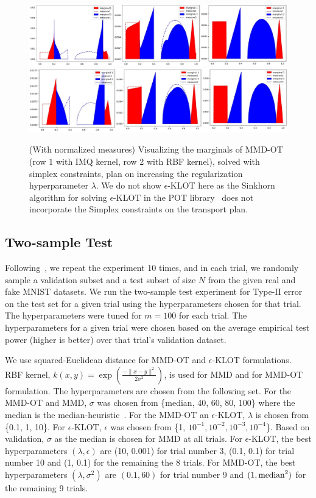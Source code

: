 \begin{figure}[t]
    \centering
    \includegraphics[width=\linewidth]{chapter-1/images/bal-IMQ.pdf}\\
\includegraphics[width=\linewidth]{chapter-1/images/bal-RBF.pdf}
    \caption{(With normalized measures) Visualizing the marginals of MMD-OT (row 1 with IMQ kernel, row 2 with RBF kernel), solved with simplex constraints, plan on increasing the regularization hyperparameter $\lambda$. We do not show $\epsilon$-KLOT here as the Sinkhorn algorithm for solving $\epsilon$-KLOT in the POT library~\citep{flamary2021pot} does not incorporate the Simplex constraints on the transport plan.}
    \label{fig:reg-bal}
\end{figure}

\subsection{Two-sample Test}\label{app:tst}
Following~\cite{dktst}, we repeat the experiment 10 times, and in each trial, we randomly sample a validation subset and a test subset of size $N$ from the given real and fake MNIST datasets. We run the two-sample test experiment for Type-II error on the test set for a given trial using the hyperparameters chosen for that trial. The hyperparameters were tuned for $m=100$ for each trial. The hyperparameters for a given trial were chosen based on the average empirical test power (higher is better) over that trial's validation dataset. 

We use squared-Euclidean distance for MMD-OT and $\epsilon$-KLOT formulations. RBF kernel, $k(x, y) = \exp{\left(\frac{-\|x-y\|^2}{2\sigma^2}\right)}$, is used for MMD and for MMD-OT formulation. The hyperparameters are chosen from the following set. For the MMD-OT and MMD, $\sigma$ was chosen from \{\textup{median}, 40, 60, 80, 100\} where the median is the median-heuristic~\citep{gretton12a}. For the MMD-OT an $\epsilon$-KLOT, $\lambda$ is chosen from \{0.1, 1, 10\}. For $\epsilon$-KLOT, $\epsilon$ was chosen from \{1, $10^{-1}, 10^{-2}, 10^{-3}, 10^{-4}$\}. Based on validation, $\sigma$ as the median is chosen for MMD at all trials. For $\epsilon$-KLOT, the best hyperparameters $(\lambda, \epsilon)$ are (10, 0.001) for trial number 3, (0.1, 0.1) for trial number 10 and (1, 0.1) for the remaining the 8 trials. For MMD-OT, the best hyperparameters $(\lambda, \sigma^2)$ are $(0.1, 60)$ for trial number 9 and $(1, \textup{median}^2)$ for the remaining 9 trials.

